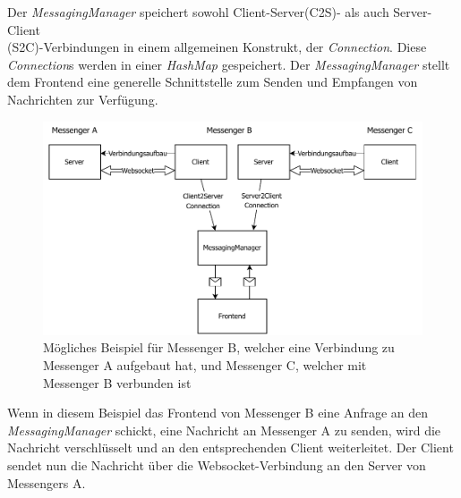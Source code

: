 \documentclass[a4paper,ngerman, headheight=28pt,12pt]{scrartcl}
\begin{document}
Der \textit{MessagingManager} speichert sowohl Client-Server(C2S)- als auch Server-Client\\(S2C)-Verbindungen in einem allgemeinen Konstrukt, der \textit{Connection}. Diese \textit{Connection}s werden in einer \textit{HashMap} gespeichert. Der \textit{MessagingManager} stellt dem Frontend eine generelle Schnittstelle zum Senden und Empfangen von Nachrichten zur Verfügung.
\begin{figure}[ht]
  \centering
  \includegraphics[width=\textwidth]{diagrams/messaging_messenger.pdf}
  \caption{Mögliches Beispiel für Messenger B, welcher eine Verbindung zu Messenger A aufgebaut hat, und Messenger C, welcher mit Messenger B verbunden ist \label{fig:MessagingMessenger}}
\end{figure}
Wenn in diesem Beispiel das Frontend von Messenger B eine Anfrage an den \textit{MessagingManager} schickt, eine Nachricht an Messenger A zu senden, wird die Nachricht verschlüsselt und an den entsprechenden Client weiterleitet. Der Client sendet nun die Nachricht über die Websocket-Verbindung an den Server von Messengers A.
\end{document}
